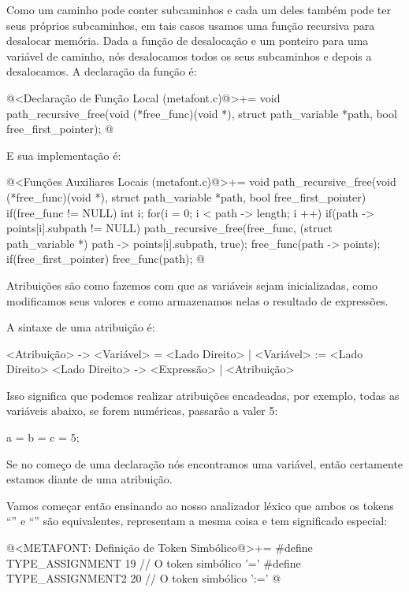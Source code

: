 Como um caminho pode conter subcaminhos e cada um deles também pode
ter seus próprios subcaminhos, em tais casos usamos uma função
recursiva para desalocar memória. Dada a função de desalocação e um
ponteiro para uma variável de caminho, nós desalocamos todos os seus
subcaminhos e depois a desalocamos. A declaração da função é:

\iniciocodigo
@<Declaração de Função Local (metafont.c)@>+=
void path_recursive_free(void (*free_func)(void *),
                         struct path_variable *path,
                         bool free_first_pointer);
@
\fimcodigo

E sua implementação é:

\iniciocodigo
@<Funções Auxiliares Locais (metafont.c)@>+=
void path_recursive_free(void (*free_func)(void *),
                         struct path_variable *path,
                         bool free_first_pointer){
  if(free_func != NULL){
    int i;
    for(i = 0; i < path -> length; i ++){
      if(path -> points[i].subpath != NULL)
        path_recursive_free(free_func, (struct path_variable *)
                                       path -> points[i].subpath, true);
    }
    free_func(path -> points);
    if(free_first_pointer)
      free_func(path);
  }
}
@
\fimcodigo



Atribuições são como fazemos com que as variáveis sejam inicializadas,
como modificamos seus valores e como armazenamos nelas o resultado de
expressões.

A sintaxe de uma atribuição é:

\alinhaverbatim
<Atribuição> -> <Variável> = <Lado Direito> |
                <Variável> := <Lado Direito>
<Lado Direito> -> <Expressão> | <Atribuição>
\alinhanormal

Isso significa que podemos realizar atribuições encadeadas, por
exemplo, todas as variáveis abaixo, se forem numéricas, passarão a
valer 5:

\alinhaverbatim
a = b = c = 5;
\alinhanormal

Se no começo de uma declaração nós encontramos uma variável, então
certamente estamos diante de uma atribuição.

Vamos começar então ensinando ao nosso analizador léxico que ambos os
tokens ``\monoespaco{=}'' e ``\monoespaco{:=}'' são equivalentes,
representam a mesma coisa e tem significado especial:

\iniciocodigo
@<METAFONT: Definição de Token Simbólico@>+=
#define TYPE_ASSIGNMENT            19 // O token simbólico '='
#define TYPE_ASSIGNMENT2           20 // O token simbólico ':='
@
\fimcodigo

